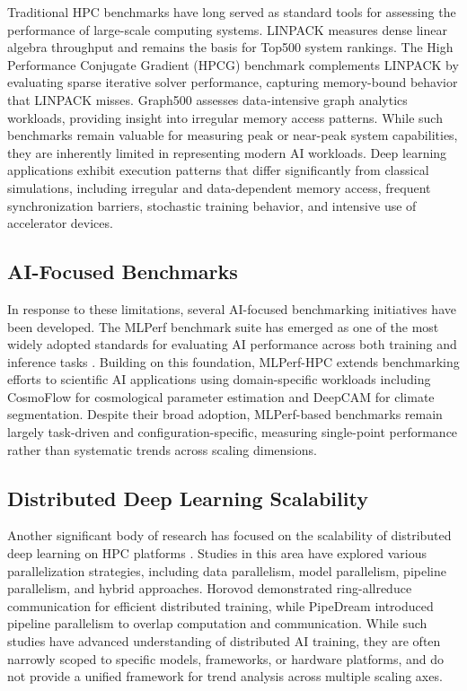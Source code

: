 \documentclass{llncs}
\begin{document}
Traditional HPC benchmarks have long served as standard tools for assessing the performance of large-scale computing systems. LINPACK \cite{Dongarra2003LINPACK} measures dense linear algebra throughput and remains the basis for Top500 system rankings. The High Performance Conjugate Gradient (HPCG) benchmark \cite{Dongarra2016} complements LINPACK by evaluating sparse iterative solver performance, capturing memory-bound behavior that LINPACK misses. Graph500 \cite{Murphy2010Graph500} assesses data-intensive graph analytics workloads, providing insight into irregular memory access patterns. While such benchmarks remain valuable for measuring peak or near-peak system capabilities, they are inherently limited in representing modern AI workloads. Deep learning applications exhibit execution patterns that differ significantly from classical simulations, including irregular and data-dependent memory access, frequent synchronization barriers, stochastic training behavior, and intensive use of accelerator devices.

\subsection{AI-Focused Benchmarks}

In response to these limitations, several AI-focused benchmarking initiatives have been developed. The MLPerf benchmark suite has emerged as one of the most widely adopted standards for evaluating AI performance across both training and inference tasks \cite{Mattson2020MLPerf, MLCommons2023}. Building on this foundation, MLPerf-HPC \cite{Farrell2021DeepCAM} extends benchmarking efforts to scientific AI applications using domain-specific workloads including CosmoFlow \cite{Mathuriya2018CosmoFlow} for cosmological parameter estimation and DeepCAM for climate segmentation. Despite their broad adoption, MLPerf-based benchmarks remain largely task-driven and configuration-specific, measuring single-point performance rather than systematic trends across scaling dimensions.

\subsection{Distributed Deep Learning Scalability}

Another significant body of research has focused on the scalability of distributed deep learning on HPC platforms \cite{BenNun2019, Narayanan2019}. Studies in this area have explored various parallelization strategies, including data parallelism, model parallelism, pipeline parallelism, and hybrid approaches. Horovod \cite{Sergeev2018} demonstrated ring-allreduce communication for efficient distributed training, while PipeDream \cite{Narayanan2019} introduced pipeline parallelism to overlap computation and communication. While such studies have advanced understanding of distributed AI training, they are often narrowly scoped to specific models, frameworks, or hardware platforms, and do not provide a unified framework for trend analysis across multiple scaling axes.
\end{document}
